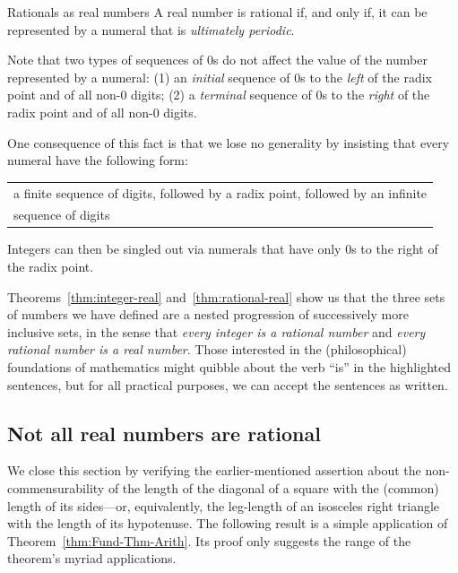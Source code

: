 \begin{theorem}{Rationals as real numbers}
\label{thm:rational-real}
\noindent
A real number is rational if, and only if, it can be represented by a
numeral that is {\em ultimately periodic}.
\end{theorem}

%
Note that two types of sequences of $0$s do not affect the value of
the number represented by a numeral: (1) an {\em initial} sequence
of $0$s to the {\em left} of the radix point and of all non-$0$
digits; (2) a {\em terminal} sequence of $0$s to the {\em right} of
the radix point and of all non-$0$ digits.

One consequence of this fact is that we lose no generality by
insisting that every numeral have the following form:

\smallskip

\hspace*{.15in}
\begin{tabular}{l}
a finite sequence of digits, followed by a radix point, followed by an
infinite \\
sequence of digits
\end{tabular}

Integers can then be singled out via numerals that have only $0$s to
the right of the radix point.

Theorems~\ref{thm:integer-real} and~\ref{thm:rational-real} show us
that the three sets of numbers we have defined are a nested
progression of successively more inclusive sets, in the sense that
{\em every integer is a rational number} and {\em every rational
  number is a real number}.  Those interested in the (philosophical)
foundations of mathematics might quibble about the verb ``is'' in the
highlighted sentences, but for all practical purposes, we can accept
the sentences as written.


\subsection{Not all real numbers are rational}

We close this section by verifying the earlier-mentioned assertion
about the non-commensurability of the length of the diagonal of a
square with the (common) length of its sides---or, equivalently, the
leg-length of an isosceles right triangle with the length of its
hypotenuse.
%
The following result is a simple application of
Theorem~\ref{thm:Fund-Thm-Arith}.  Its proof only suggests the range
of the theorem's myriad applications.

